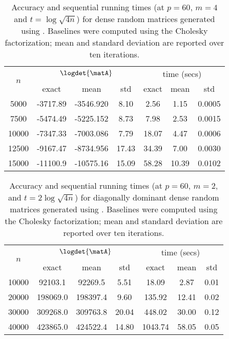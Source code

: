 \begin{table}
\center
\scriptsize
\begin{tabular}{|c|c|c|c|c|c|c|}
\hline
\multirow{2}{*}{$n$}  &
\multicolumn{3}{|c|}{$\logdet{\matA}$} &
\multicolumn{3}{|c|}{time (secs)} \\
\cline{2-7}
      &   exact    & mean       & std   &   exact  & mean  &  std   \\\hline
5000  & -3717.89  & -3546.920  &  8.10  &   2.56   &  1.15 & 0.0005 \\\hline
7500  & -5474.49  & -5225.152  &  8.73  &   7.98   &  2.53 & 0.0015 \\\hline
10000 & -7347.33  & -7003.086  &  7.79  &  18.07   &  4.47 & 0.0006 \\\hline
12500 & -9167.47  & -8734.956  & 17.43  &  34.39   &  7.00 & 0.0030 \\\hline
15000 & -11100.9  & -10575.16  & 15.09  &  58.28   & 10.39 & 0.0102 \\\hline
\end{tabular}
\caption{
Accuracy and sequential running times (at $p=60$, $m=4$ and $t=\log\sqrt{4n}$) for dense
random matrices generated using .
Baselines were computed using the Cholesky factorization; mean and standard
deviation are reported over ten iterations.
}
\label{tbl:dense-abs}
\normalsize
\end{table}
\begin{table}
\center
\scriptsize
\begin{tabular}{|c|c|c|c|c|c|c|}
\hline
\multirow{2}{*}{$n$}  &
\multicolumn{3}{|c|}{$\logdet{\matA}$} &
\multicolumn{3}{|c|}{time (secs)} \\
\cline{2-7}
      &   exact   & mean     & std    &   exact  & mean  &  std   \\\hline
10000 &  92103.1  &  92269.5 &  5.51  &   18.09  &  2.87 &  0.01  \\\hline
20000 & 198069.0  & 198397.4 &  9.60  &  135.92  & 12.41 &  0.02  \\\hline
30000 & 309268.0  & 309763.8 & 20.04  &  448.02  & 30.00 &  0.12  \\\hline
40000 & 423865.0  & 424522.4 & 14.80  & 1043.74  & 58.05 &  0.05  \\\hline
\end{tabular}
\caption{
Accuracy and sequential running times (at $p=60$, $m=2$, and $t=2\log\sqrt{4n}$) for
diagonally dominant dense random matrices generated using
.
Baselines were computed using the Cholesky factorization; mean and standard
deviation are reported over ten iterations.
}
\label{tbl:dense-dd-abs}
\normalsize
\end{table}
